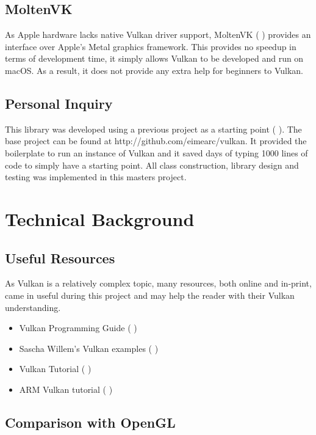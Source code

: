 \documentclass[12pt]{report}
\newcommand{\citebu}[1]{(\citenoparen{#1})}
\newcommand{\citenoparen}[1]{\citeauthor{#1} \citeyear{#1}}
\newcommand{\citesoftware}[1]{(\citeauthor{#1} \citeyear{#1})}
\theoremstyle{definition}
\begin{document}
    \section{MoltenVK}

      As Apple hardware lacks native Vulkan driver support, MoltenVK
      \citesoftware{moltenvk} provides an interface over Apple's Metal graphics framework. This provides no
      speedup in terms of development time, it simply allows Vulkan to
      be developed and run on macOS. As a result, it does not provide any
      extra help for beginners to Vulkan.

    \section{Personal Inquiry}

      This library was developed using a previous project as a starting point \citebu{personalinquiry}.
      The base project can be found at http://github.com/eimearc/vulkan.
      It provided the boilerplate to run an instance of Vulkan and it
      saved days of typing 1000 lines of code to simply have a
      starting point. All class construction, library design
      and testing was implemented in this masters project.

  \chapter{Technical Background}

    \section{Useful Resources}

      As Vulkan is a relatively complex topic, many resources, both online and
      in-print, came in useful during this project and may help the reader
      with their Vulkan understanding.

      \begin{itemize}
        \item Vulkan Programming Guide \citebu{vulkanbook}
        \item Sascha Willem's Vulkan examples \citebu{sascha}
        \item Vulkan Tutorial \citebu{vulkantutorial}
        \item ARM Vulkan tutorial \citebu{arm}
      \end{itemize}

    \section{Comparison with OpenGL}
\end{document}
